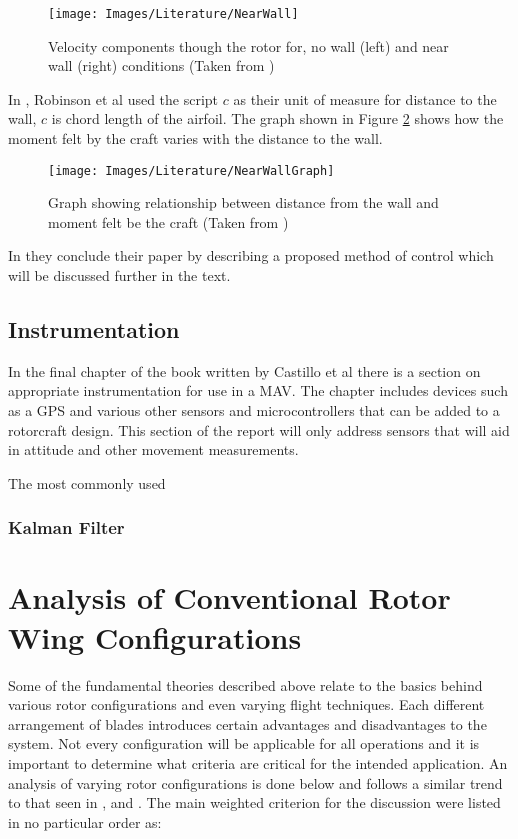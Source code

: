 		\begin{figure}[H]
			\centering
			\texttt{[image: Images/Literature/NearWall]}     
			\caption{Velocity components though the rotor for, no wall (left) and near wall (right) conditions (Taken from \cite{NearWall})}
			\label{IM_NearWall}
		\end{figure}
		
		In \cite{NearWall}, Robinson et al used the script $c$ as their unit of measure for distance to the wall, $c$ is chord length of the airfoil. The graph shown in Figure \ref{IM_NearWallGraph} shows how the moment felt by the craft varies with the distance to the wall.
		
		\begin{figure}[H]
			\centering
			\texttt{[image: Images/Literature/NearWallGraph]}     
			\caption{Graph showing relationship between distance from the wall and moment felt be the craft (Taken from \cite{NearWall})}
			\label{IM_NearWallGraph}
		\end{figure}
		
		In \cite{NearWall} they conclude their paper by describing a proposed method of control which will be discussed further in the text.
	
	\subsection{Instrumentation}
	In the final chapter of the book written by Castillo et al \cite{MiniFlying} there is a section on appropriate instrumentation for use in a MAV. The chapter includes devices such as a GPS and various other sensors and microcontrollers that can be added to a rotorcraft design. This section of the report will only address sensors that will aid in attitude and other movement measurements.
	
	The most commonly used
		\subsubsection{Kalman Filter}

\section{Analysis of Conventional Rotor Wing Configurations}

Some of the fundamental theories described above relate to the basics behind various rotor configurations and even varying flight techniques. Each different arrangement of blades introduces certain advantages and disadvantages to the system. Not every configuration will be applicable for all operations and it is important to determine what criteria are critical for the intended application.  An analysis of varying rotor configurations is done below and follows a similar trend to that seen in \cite{RotorConfig}, \cite{Bohorquez} and \cite{NewMAV}. The main weighted criterion for the discussion were listed in no particular order as:

